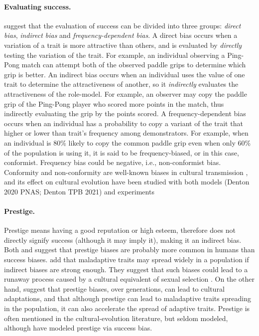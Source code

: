 \documentclass[11pt]{article}
\begin{document}
\paragraph{Evaluating success.}
\citet[Ch. 5]{evolutionBook} suggest that the evaluation of success can be divided into three groups: \textit{direct bias}, \textit{indirect bias} and \textit{frequency-dependent bias}.
A direct bias occurs when a variation of a trait is more attractive than others, and is evaluated by \textit{directly} testing the variation of the trait.
For example, an individual observing a Ping-Pong match can attempt both of the observed paddle grips to determine which grip is better.
An indirect bias occurs when an individual uses the value of one trait to determine the attractiveness of another, so it \textit{indirectly} evaluates the attractiveness of the role-model.
For example, an observer may copy the paddle grip of the Ping-Pong player who scored more points in the match, thus indirectly evaluating the grip by the points scored.
A frequency-dependent bias occurs when an individual has a probability to copy a variant of the trait that higher or lower than trait's frequency among demonstrators. 
For example, when an individual is 80\% likely to copy the common paddle grip even when only 60\% of the population is using it, it is said to be frequency-biased, or in this case, conformist.
Frequency bias could be negative, i.e., non-conformist bias. 
Conformity and non-conformity are well-known biases in cultural transmission \citep{conformism}, and its effect on cultural evolution have been studied with both models (Denton 2020 PNAS; Denton TPB 2021) and experiments \citet{negativeFrequency} 
 
\paragraph{Prestige.}
Prestige means having a good reputation or high esteem, therefore does not directly signify success (although it may imply it), making it an indirect bias.
Both \citet[Ch. 8]{evolutionBook} and \citet{complexityPaper} suggest that prestige biases are probably more common in humans than success biases.
\citet[Ch. 8]{evolutionBook} add that maladaptive traits may spread widely in a population if indirect biases are strong enough.
They suggest that such biases could lead to a runaway process caused by a cultural equivalent of sexual selection \citep{sexualSelectionBook}.
On the other hand, \citet{fijian_social_bias} suggest that prestige biases, over generations, can lead to cultural adaptations, and that although prestige can lead to maladaptive traits spreading in the population, it can also accelerate the spread of adaptive traits.
Prestige is often mentioned in the cultural-evolution literature, but seldom modeled, although \citet{evolutionBook} have modeled prestige via success bias. %
\end{document}
